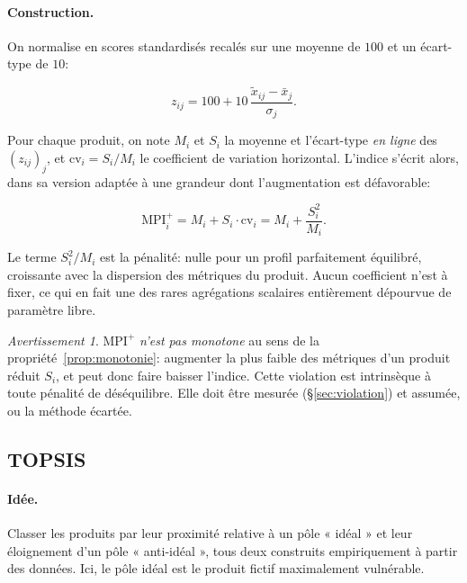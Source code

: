 \documentclass[11pt,a4paper]{article}
\theoremstyle{definition}
\theoremstyle{remark}
\newtheorem{avertissement}{Avertissement}[section]
\begin{document}
\bigskip

\paragraph{Construction.} On normalise en scores standardisés recalés sur une moyenne de $100$ et
un écart-type de $10$:

\medskip

\[
z_{ij} = 100 + 10\,\frac{\tilde{x}_{ij} - \bar{x}_j}{\sigma_j}.
\]

\bigskip

Pour chaque produit, on note $M_i$ et $S_i$ la moyenne et l'écart-type \emph{en ligne} des
$(z_{ij})_j$, et $\mathrm{cv}_i = S_i/M_i$ le coefficient de variation horizontal. L'indice
s'écrit alors, dans sa version adaptée à une grandeur dont l'augmentation est défavorable:

\medskip

\[
\mathrm{MPI}^{+}_i = M_i + S_i \cdot \mathrm{cv}_i = M_i + \frac{S_i^2}{M_i}.
\]

\bigskip

Le terme $S_i^2/M_i$ est la pénalité: nulle pour un profil parfaitement équilibré, croissante
avec la dispersion des métriques du produit. Aucun coefficient n'est à fixer, ce qui en fait une
des rares agrégations scalaires entièrement dépourvue de paramètre libre.

\bigskip

\begin{avertissement}
  $\mathrm{MPI}^{+}$ \emph{n'est pas monotone} au sens de la propriété~\ref{prop:monotonie}:
  augmenter la plus faible des métriques d'un produit réduit $S_i$, et peut donc faire baisser
  l'indice. Cette violation est intrinsèque à toute pénalité de déséquilibre. Elle doit être
  mesurée (§\ref{sec:violation}) et assumée, ou la méthode écartée.
\end{avertissement}

\bigskip

\subsection{TOPSIS}
\label{sec:topsis}

\paragraph{Idée.} Classer les produits par leur proximité relative à un pôle « idéal » et leur
éloignement d'un pôle « anti-idéal », tous deux construits empiriquement à partir des données.
Ici, le pôle idéal est le produit fictif maximalement vulnérable.
\end{document}
